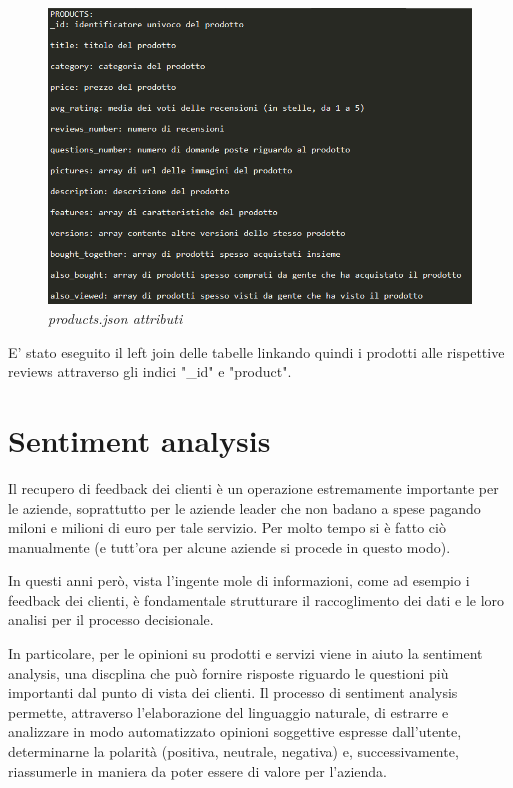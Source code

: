 \documentclass[a4paper,12pt]{article}
\begin{document}
\begin{figure}[H]
	\centering
	\includegraphics[width=0.9\linewidth]{img/productsAttributi.png}
	\caption{\textit{products.json attributi}}
\end{figure}

\noindent E' stato eseguito il left join delle tabelle linkando quindi i prodotti alle rispettive reviews attraverso gli indici "\_id" e "product".

\section{Sentiment analysis}
Il recupero di feedback dei clienti è un operazione estremamente importante per le aziende, soprattutto per le aziende leader che non badano a spese pagando miloni e milioni di euro per tale servizio. Per molto tempo si è fatto ciò manualmente (e tutt'ora per alcune aziende si procede in questo modo).

\noindent In questi anni però, vista l'ingente mole di informazioni, come ad esempio i feedback dei clienti, è fondamentale strutturare il raccoglimento dei dati e le loro analisi per il processo decisionale.

\noindent In particolare, per le opinioni su prodotti e servizi viene in aiuto la sentiment
analysis, una discplina che può fornire risposte riguardo le questioni più importanti dal punto di vista dei clienti. Il processo di sentiment analysis permette, attraverso l’elaborazione del linguaggio naturale, di estrarre e analizzare in modo automatizzato opinioni soggettive
espresse dall’utente, determinarne la polarità (positiva, neutrale, negativa) e,
successivamente, riassumerle in maniera da poter essere di valore per l’azienda.
\end{document}
